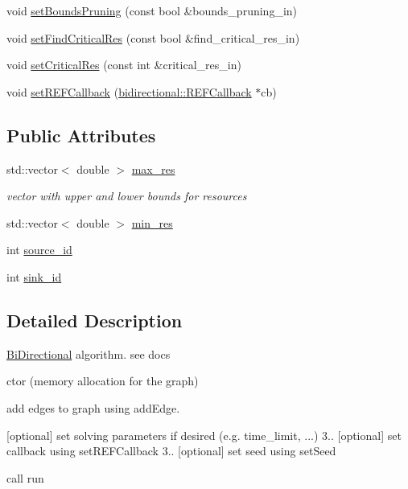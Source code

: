 \begin{DoxyCompactItemize}
void \hyperlink{classbidirectional_1_1BiDirectional_ac3cb989cdc2f4c1cedde6b30a9e7c1d8}{set\+Bounds\+Pruning} (const bool \&bounds\+\_\+pruning\+\_\+in)
\item 
void \hyperlink{classbidirectional_1_1BiDirectional_ad309aa627316fbccdf1d6e747d064c05}{set\+Find\+Critical\+Res} (const bool \&find\+\_\+critical\+\_\+res\+\_\+in)
\item 
void \hyperlink{classbidirectional_1_1BiDirectional_ad0a3ef7e4a5fcabfa34f9401532258b5}{set\+Critical\+Res} (const int \&critical\+\_\+res\+\_\+in)
\item 
void \hyperlink{classbidirectional_1_1BiDirectional_a901d84e260c2d18c3a3f2d14a5492278}{set\+R\+E\+F\+Callback} (\hyperlink{classbidirectional_1_1REFCallback}{bidirectional\+::\+R\+E\+F\+Callback} $\ast$cb)
\end{DoxyCompactItemize}
\subsection*{Public Attributes}
\begin{DoxyCompactItemize}
\item 
std\+::vector$<$ double $>$ \hyperlink{classbidirectional_1_1BiDirectional_af181d7ebb76e773b7aa5da0da40cc74d}{max\+\_\+res}
\begin{DoxyCompactList}\small\item\em vector with upper and lower bounds for resources \end{DoxyCompactList}\item 
std\+::vector$<$ double $>$ \hyperlink{classbidirectional_1_1BiDirectional_af144538113c466b21e18a128f1ffb18e}{min\+\_\+res}
\item 
int \hyperlink{classbidirectional_1_1BiDirectional_ae8256189cc23d7033a5e8e36ac36ec4a}{source\+\_\+id}
\item 
int \hyperlink{classbidirectional_1_1BiDirectional_a742976c94bdf77c2bfae680ffd2e468d}{sink\+\_\+id}
\end{DoxyCompactItemize}


\subsection{Detailed Description}
\hyperlink{classbidirectional_1_1BiDirectional}{Bi\+Directional} algorithm. see docs


\begin{DoxyEnumerate}
\item ctor (memory allocation for the graph)
\item add edges to graph using {\ttfamily add\+Edge}.
\item \mbox{[}optional\mbox{]} set solving parameters if desired (e.\+g. time\+\_\+limit, ...) 3.. \mbox{[}optional\mbox{]} set callback using {\ttfamily set\+R\+E\+F\+Callback} 3.. \mbox{[}optional\mbox{]} set seed using {\ttfamily set\+Seed}
\item call {\ttfamily run} 
\end{DoxyEnumerate}

